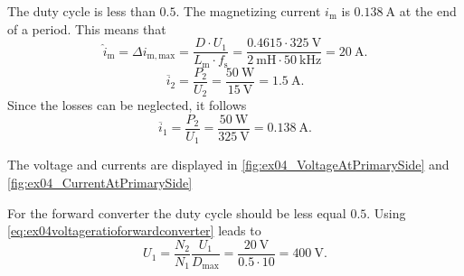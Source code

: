 \begin{solutionblock}
    The duty cycle is less than $0.5$. The magnetizing current $i_\mathrm{m}$ is $\SI{0.138}{\ampere}$ at the end of a period.
    This means that
    \begin{equation}
        \hat{i}_\mathrm{m}=\Delta i_\mathrm{m,max}= \frac{D \cdot U_\mathrm{1}}{L_\mathrm{m} \cdot f_\mathrm{s}} =
        \frac{0.4615 \cdot \SI{325}{\volt}}{\SI{2}{\milli\henry} \cdot \SI{50}{\kilo\hertz}} = \SI{20}{\ampere}.
    \end{equation}    
    \begin{equation}
        \overline{i}_\mathrm{2}=\frac{P_\mathrm{2}}{U_\mathrm{2}}=\frac{\SI{50}{\watt}}{\SI{15}{\volt}}=\SI{1.5}{\ampere}.
    \end{equation}
    Since the losses can be neglected, it follows
    \begin{equation}
        \overline{i}_\mathrm{1}=\frac{P_\mathrm{2}}{U_\mathrm{1}}=\frac{\SI{50}{\watt}}{\SI{325}{\volt}}=\SI{0.138}{\ampere}.
    \end{equation}
\end{solutionblock}


\begin{solutionblock}
    The voltage and currents are displayed in \autoref{fig:ex04_VoltageAtPrimarySide} and \autoref{fig:ex04_CurrentAtPrimarySide}
    
\end{solutionblock}

\begin{solutionblock}
    For the forward converter the duty cycle should be less equal $0.5$. Using \eqref{eq:ex04voltageratioforwardconverter} leads to
    \begin{equation}
        U_\mathrm{1}=\frac{N_\mathrm{2}}{N_\mathrm{1}}\frac{U_\mathrm{1}}{D_\mathrm{max}}=
        \frac{\SI{20}{\volt}}{0.5 \cdot 10}=\SI{400}{\volt}.
    \end{equation}
\end{solutionblock}


